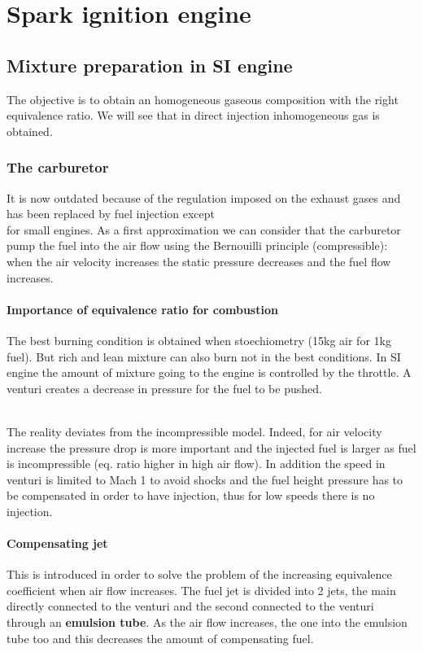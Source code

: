 
\chapter{Spark ignition engine}
\section{Mixture preparation in SI engine}
	The objective is to obtain an homogeneous gaseous composition with the right equivalence ratio. We will see that in direct injection inhomogeneous gas is obtained. 
	
\subsection{The carburetor}
	It is now outdated because of the regulation imposed on the exhaust gases and has been replaced by fuel injection except\ \\
	 
	for small engines.  As a first approximation we can consider that the carburetor pump the fuel into the air flow using the Bernouilli principle (compressible): when the air velocity increases the static pressure decreases and the fuel flow increases. 
	
\subsubsection{Importance of equivalence ratio for combustion}
	The best burning condition is obtained when stoechiometry (15kg air for 1kg fuel). But rich and lean mixture can also burn not in the best conditions. In SI engine the amount of mixture going to the engine is controlled by the throttle. A venturi creates a decrease in pressure for the fuel to be pushed.  
		
	\ \\
	
	The reality deviates from the incompressible model. Indeed, for air velocity increase the pressure drop is more important and the injected fuel is larger as fuel is incompressible (eq. ratio higher in high air flow). In addition the speed in venturi is limited to Mach 1 to avoid shocks and the fuel height pressure has to be compensated in order to have injection, thus for low speeds there is no injection. 
	
\subsubsection{Compensating jet}
	This is introduced in order to solve the problem of the increasing equivalence coefficient when air flow increases. The fuel jet is divided into 2 jets, the main directly connected to the venturi and the second connected to the venturi through an \textbf{emulsion tube}. As the air flow increases, the one into the emulsion tube too and this decreases the amount of compensating fuel. 
	
